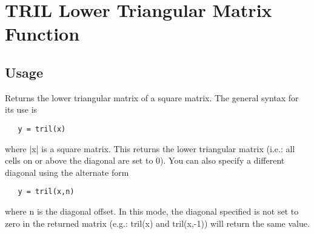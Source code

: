 \section{TRIL Lower Triangular Matrix Function}

\subsection{Usage}

 
 Returns the lower triangular matrix of a square matrix. The general
 syntax for its use is
\begin{verbatim}
   y = tril(x)
\end{verbatim}
 where |x| is a square matrix. This returns the lower triangular matrix
 (i.e.: all cells on or above the diagonal are set to 0). You can also
 specify a different diagonal using the alternate form
\begin{verbatim}
   y = tril(x,n)
\end{verbatim}
 where n is the diagonal offset. In this mode, the diagonal specified 
 is not set to zero in the returned matrix (e.g.: tril(x) and tril(x,-1))
 will return the same value.
